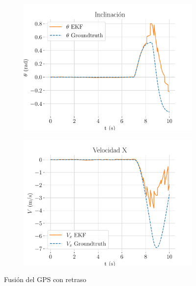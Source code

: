 \begin{figure}[b]
\begin{subfigure}[t]{0.49\textwidth}
		\centering
		\includegraphics[width=\textwidth]{estimador_px4/im_simu/no_handle_delay/theta}
		\caption{}
	\end{subfigure}
	\quad
	\begin{subfigure}[t]{0.49\textwidth}
		\centering
		\includegraphics[width=\textwidth]{estimador_px4/im_simu/no_handle_delay/vx}
		\caption{}
	\end{subfigure}
	\quad
	\caption{Fusión del GPS con retraso}
	\label{fig:no-handle}
\end{figure}

